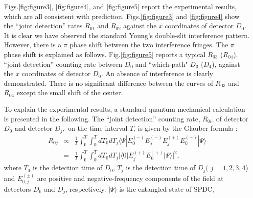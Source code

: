 Figs.\ref{fig:figure3}, \ref{fig:figure4}, and \ref{fig:figure5} report the experimental
results, which are all consistent with prediction. Figs.\ref{fig:figure3} and
\ref{fig:figure4} show the ``joint detection'' rates $R_{01}$ and $R_{02}$ against the
$x$ coordinates of detector $D_{0}$. It is clear we have observed the standard Young's
double-slit interference pattern. However, there is a $\pi $ phase shift between the two
interference fringes. The $\pi$ phase shift
is explained as follows. Fig.\ref{fig:figure5} reports a typical $%
R_{03}$ ($R_{04}$), ``joint detection'' counting rate between $D_{0}$ and ``which-path" $%
D_{3}$ ($D_{4}$), against the $x$ coordinates of detector $D_{0}$. An absence of
interference is clearly demonstrated. There is no significant difference between the
curves of $R_{03}$ and $R_{04}$ except the small shift of the center.

To explain the experimental results, a standard quantum mechanical calculation is
presented in the following. The ``joint detection'' counting rate, $R_{0i}$, of detector
$D_{0}$ and detector $D_{j},$ on the time interval $T$, is given by the Glauber formula
\cite{Glauber}:
\begin{eqnarray}
R_{0j}&\propto& \frac{1}{T}\int_{0}^{T}\int_{0}^{T}dT_{0}dT_{j}\langle \Psi |
E_{0}^{(-)}E_{j}^{(-)}E_{j}^{(+)}E_{0}^{(+)}| \Psi \rangle \nonumber \\
&=&\frac{1}{T}\int_{0}^{T}\int_{0}^{T}dT_{0}dT_{j}| \langle 0| E_{j}^{(+)}E_{0}^{(+)}|
\Psi \rangle | ^{2} , \label{coin}
\end{eqnarray}
where $T_{0}$ is the detection time of $D_{0}$, $T_{j}$ is the detection time of $D_{j}($
$j=1,2,3,4$) and $E_{0,j}^{(\pm )}$ are positive and negative-frequency components of the
field at detectors $D_{0}$ and $D_{j}$, respectively. $| \Psi \rangle$ is the entangled
state of SPDC,

